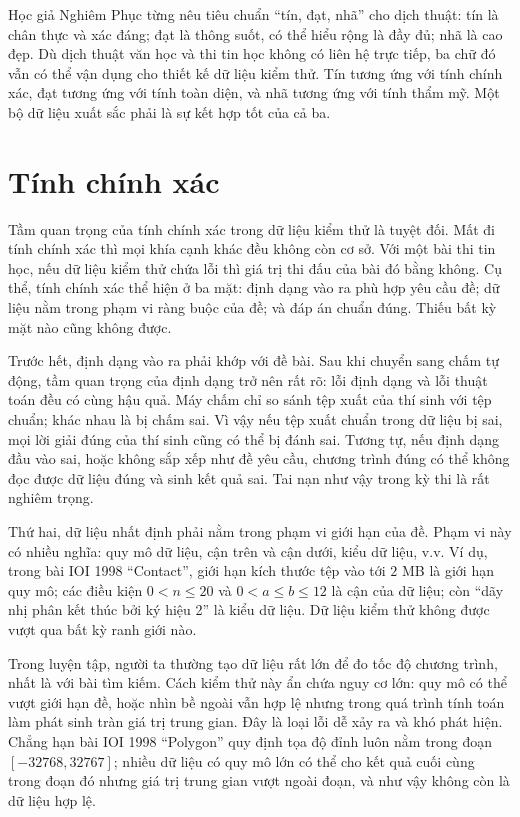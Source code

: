 \documentclass[11pt]{article}
\begin{document}
Học giả Nghiêm Phục từng nêu tiêu chuẩn ``tín, đạt, nhã'' cho dịch thuật:
tín là chân thực và xác đáng; đạt là thông suốt, có thể hiểu rộng là đầy đủ;
nhã là cao đẹp. Dù dịch thuật văn học và thi tin học không có liên hệ trực
tiếp, ba chữ đó vẫn có thể vận dụng cho thiết kế dữ liệu kiểm thử. Tín tương
ứng với tính chính xác, đạt tương ứng với tính toàn diện, và nhã tương ứng với
tính thẩm mỹ. Một bộ dữ liệu xuất sắc phải là sự kết hợp tốt của cả ba.

\section{Tính chính xác}

Tầm quan trọng của tính chính xác trong dữ liệu kiểm thử là tuyệt đối. Mất đi
tính chính xác thì mọi khía cạnh khác đều không còn cơ sở. Với một bài thi tin
học, nếu dữ liệu kiểm thử chứa lỗi thì giá trị thi đấu của bài đó bằng không.
Cụ thể, tính chính xác thể hiện ở ba mặt: định dạng vào ra phù hợp yêu cầu đề;
dữ liệu nằm trong phạm vi ràng buộc của đề; và đáp án chuẩn đúng. Thiếu bất kỳ
mặt nào cũng không được.

Trước hết, định dạng vào ra phải khớp với đề bài. Sau khi chuyển sang chấm tự
động, tầm quan trọng của định dạng trở nên rất rõ: lỗi định dạng và lỗi thuật
toán đều có cùng hậu quả. Máy chấm chỉ so sánh tệp xuất của thí sinh với tệp
chuẩn; khác nhau là bị chấm sai. Vì vậy nếu tệp xuất chuẩn trong dữ liệu bị
sai, mọi lời giải đúng của thí sinh cũng có thể bị đánh sai. Tương tự, nếu
định dạng đầu vào sai, hoặc không sắp xếp như đề yêu cầu, chương trình đúng có
thể không đọc được dữ liệu đúng và sinh kết quả sai. Tai nạn như vậy trong kỳ
thi là rất nghiêm trọng.

Thứ hai, dữ liệu nhất định phải nằm trong phạm vi giới hạn của đề. Phạm vi này
có nhiều nghĩa: quy mô dữ liệu, cận trên và cận dưới, kiểu dữ liệu, v.v. Ví
dụ, trong bài IOI 1998 ``Contact'', giới hạn kích thước tệp vào tới $2$ MB là
giới hạn quy mô; các điều kiện $0<n\le 20$ và $0<a\le b\le 12$ là cận của dữ
liệu; còn ``dãy nhị phân kết thúc bởi ký hiệu 2'' là kiểu dữ liệu. Dữ liệu
kiểm thử không được vượt qua bất kỳ ranh giới nào.

Trong luyện tập, người ta thường tạo dữ liệu rất lớn để đo tốc độ chương
trình, nhất là với bài tìm kiếm. Cách kiểm thử này ẩn chứa nguy cơ lớn: quy mô
có thể vượt giới hạn đề, hoặc nhìn bề ngoài vẫn hợp lệ nhưng trong quá trình
tính toán làm phát sinh tràn giá trị trung gian. Đây là loại lỗi dễ xảy ra và
khó phát hiện. Chẳng hạn bài IOI 1998 ``Polygon'' quy định tọa độ đỉnh luôn
nằm trong đoạn $[-32768,32767]$; nhiều dữ liệu có quy mô lớn có thể cho kết
quả cuối cùng trong đoạn đó nhưng giá trị trung gian vượt ngoài đoạn, và như
vậy không còn là dữ liệu hợp lệ.
\end{document}
